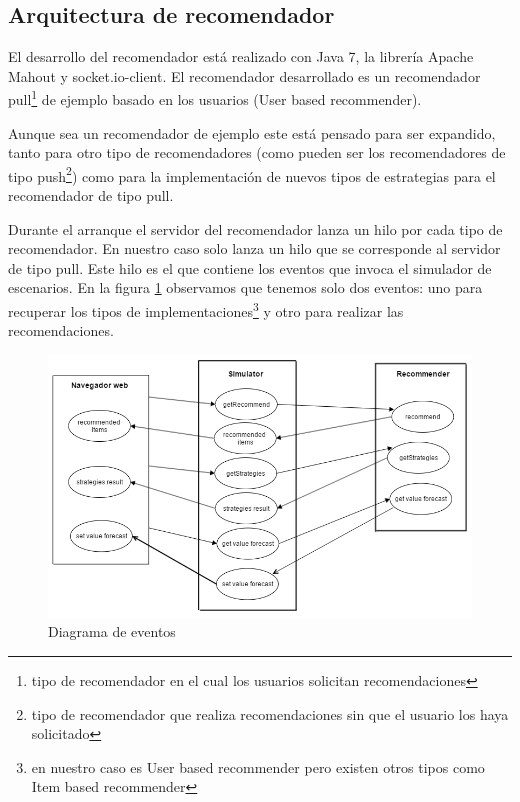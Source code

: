 \subsection{Arquitectura de recomendador}

El desarrollo del recomendador está realizado con Java 7, la librería Apache Mahout y socket.io-client. El recomendador desarrollado es un recomendador pull\footnote{tipo de recomendador en el cual los usuarios solicitan recomendaciones} de ejemplo basado en los usuarios (User based recommender). 

Aunque sea un recomendador de ejemplo este está pensado para ser expandido, tanto para otro tipo de recomendadores (como pueden ser los recomendadores de tipo push\footnote{tipo de recomendador que realiza recomendaciones sin que el usuario los haya solicitado}) como para la implementación de nuevos tipos de estrategias para el recomendador de tipo pull.

Durante el arranque el servidor del recomendador lanza un hilo por cada tipo de recomendador. En nuestro caso solo lanza un hilo que se corresponde al servidor de tipo pull. Este hilo es el que contiene los eventos que invoca el simulador de escenarios. En la figura \ref{diagramaEventos} observamos que tenemos solo dos eventos: uno para recuperar los tipos de implementaciones\footnote{en nuestro caso es User based recommender pero existen otros tipos como Item based recommender} y otro para realizar las recomendaciones.

\begin{figure}[H]
\centering\includegraphics[scale=0.5]{imagenes/diagrama-de-eventos.png}
\caption{Diagrama de eventos}
\label{diagramaEventos}
\end{figure}

